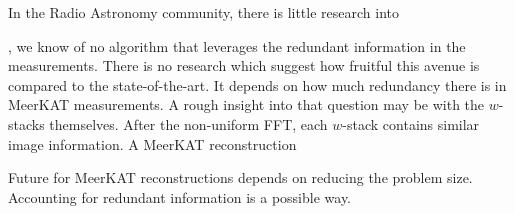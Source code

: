 In the Radio Astronomy community, there is little research into 

, we know of no algorithm that leverages the redundant information in the measurements. There is no research which suggest how fruitful this avenue is compared to the state-of-the-art. It depends on how much redundancy there is in MeerKAT measurements. A rough insight into that question may be with the $w$-stacks themselves. After the non-uniform FFT, each $w$-stack contains similar image information. A MeerKAT reconstruction 

Future for MeerKAT reconstructions depends on reducing the problem size. Accounting for redundant information is a possible way.















